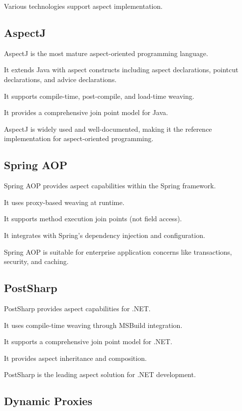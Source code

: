 \documentclass[11pt]{article}
\begin{document}
Various technologies support aspect implementation.

\subsection{AspectJ}

AspectJ is the most mature aspect-oriented programming language.

It extends Java with aspect constructs including aspect declarations, pointcut declarations, and advice declarations.

It supports compile-time, post-compile, and load-time weaving.

It provides a comprehensive join point model for Java.

AspectJ is widely used and well-documented, making it the reference implementation for aspect-oriented programming.

\subsection{Spring AOP}

Spring AOP provides aspect capabilities within the Spring framework.

It uses proxy-based weaving at runtime.

It supports method execution join points (not field access).

It integrates with Spring's dependency injection and configuration.

Spring AOP is suitable for enterprise application concerns like transactions, security, and caching.

\subsection{PostSharp}

PostSharp provides aspect capabilities for .NET.

It uses compile-time weaving through MSBuild integration.

It supports a comprehensive join point model for .NET.

It provides aspect inheritance and composition.

PostSharp is the leading aspect solution for .NET development.

\subsection{Dynamic Proxies}
\end{document}
